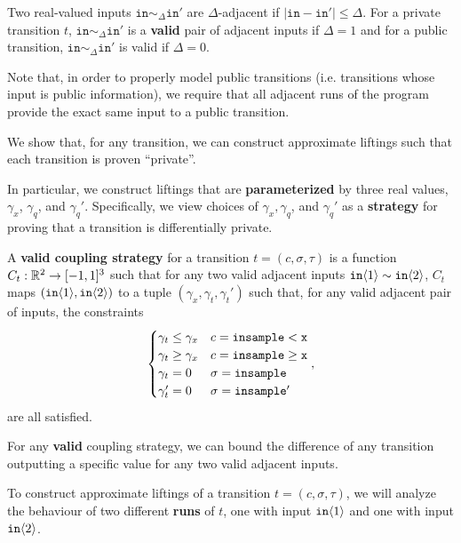 \begin{defn}
    Two real-valued inputs $\texttt{in}\sim_{\Delta} \texttt{in}'$ are $\Delta$-adjacent if $|\texttt{in}-\texttt{in}'|\leq \Delta$. For a private transition $t$, $\texttt{in}\sim_{\Delta}\texttt{in}'$ is a \textbf{valid} pair of adjacent inputs if $\Delta = 1$ and for a public transition, $\texttt{in}\sim_{\Delta}\texttt{in}'$ is valid if $\Delta = 0$.
\end{defn}

Note that, in order to properly model public transitions (i.e. transitions whose input is public information), we require that all adjacent runs of the program provide the exact same input to a public transition. 

We show that, for any transition, we can construct approximate liftings such that each transition is proven ``private''. 

In particular, we construct liftings that are \textbf{parameterized} by three real values, $\gamma_x$, $\gamma_q$, and $\gamma_q'$. Specifically, we view choices of $\gamma_x, \gamma_q$, and $\gamma_q'$ as a \textbf{strategy} for proving that a transition is differentially private.

\begin{defn}
    A \textbf{valid coupling strategy} for a transition $t = (c, \sigma, \tau)$ is a function $C_t:\RR^2\to[-1, 1]^3$ such that for any two valid adjacent inputs $\texttt{in}\brangle{1}\sim\texttt{in}\brangle{2}$, $C_t$ maps $(\texttt{in}\brangle{1},\texttt{in}\brangle{2})$ to a tuple $(\gamma_x, \gamma_t, \gamma_t')$ such that, for any valid adjacent pair of inputs, the constraints \[
        \begin{cases}
          \gamma_t\leq\gamma_x & c = \lguard[\texttt{x}]\\
          \gamma_t\geq\gamma_x & c = \gguard[\texttt{x}]\\
          \gamma_t=0 & \sigma = \texttt{insample}\\
          \gamma_t'=0 & \sigma = \texttt{insample}'
        \end{cases},
      \]
      are all satisfied. 
\end{defn}

For any \textbf{valid} coupling strategy, we can bound the difference of any transition outputting a specific value for any two valid adjacent inputs. 

To construct approximate liftings of a transition $t = (c, \sigma, \tau)$, we will analyze the behaviour of two different \textbf{runs} of $t$, one with input $\texttt{in}\brangle{1}$ and one with input $\texttt{in}\brangle{2}$. 

